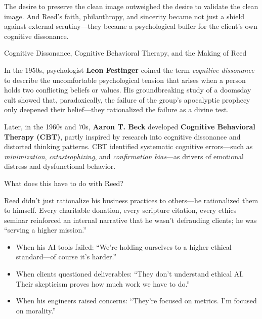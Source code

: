 The desire to preserve the clean image outweighed the desire to validate the clean image.  
And Reed’s faith, philanthropy, and sincerity became not just a shield against external scrutiny—they became a psychological buffer for the client’s own cognitive dissonance.

\medskip

\begin{HistoricalSidebar}{Cognitive Dissonance, Cognitive Behavioral Therapy, and the Making of Reed}

    In the 1950s, psychologist \textbf{Leon Festinger} coined the term \textit{cognitive dissonance} to describe the uncomfortable psychological tension that arises when a person holds two conflicting beliefs or values. His groundbreaking study of a doomsday cult showed that, paradoxically, the failure of the group's apocalyptic prophecy only deepened their belief—they rationalized the failure as a divine test.

    \medskip
    
    Later, in the 1960s and 70s, \textbf{Aaron T. Beck} developed \textbf{Cognitive Behavioral Therapy (CBT)}, partly inspired by research into cognitive dissonance and distorted thinking patterns. CBT identified systematic cognitive errors—such as \textit{minimization}, \textit{catastrophizing}, and \textit{confirmation bias}—as drivers of emotional distress and dysfunctional behavior.
    
    \medskip
    
    What does this have to do with Reed?

    \medskip
    
    Reed didn’t just rationalize his business practices to others—he rationalized them to himself. Every charitable donation, every scripture citation, every ethics seminar reinforced an internal narrative that he wasn’t defrauding clients; he was “serving a higher mission.”
    
    \medskip
    
    \begin{itemize}
        \item When his AI tools failed: “We’re holding ourselves to a higher ethical standard—of course it’s harder.”
        \item When clients questioned deliverables: “They don’t understand ethical AI. Their skepticism proves how much work we have to do.”
        \item When his engineers raised concerns: “They’re focused on metrics. I’m focused on morality.”
    \end{itemize}
    

\end{HistoricalSidebar}
